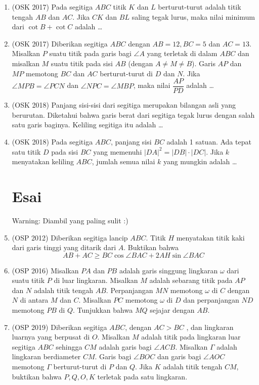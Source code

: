 \documentclass[12pt]{scrartcl}
\begin{document}
\begin{enumerate}
	
	\item
	(OSK 2017) Pada segitiga $ABC$ titik $K$ dan $L$ berturut-turut adalah titik tengah $AB$ dan $AC$. Jika $CK$ dan $BL$
saling tegak lurus, maka nilai minimum dari $\cot B + \cot C$ adalah \dots
	
	
	\item
	(OSK 2017) Diberikan segitiga $ABC$ dengan $AB = 12, BC = 5$ dan $AC = 13$. Misalkan $P$ suatu titik pada garis
bagi $\angle A$ yang terletak di dalam $ABC$ dan misalkan $M$ suatu titik pada sisi $AB$ (dengan $A\neq  M \neq
B$). Garis $AP$ dan $MP$ memotong $BC$ dan $AC$ berturut-turut di $D$ dan $N$. Jika $\angle MPB = \angle PCN$
dan $\angle NPC = \angle MBP$, maka nilai $\dfrac{AP}{PD}$
adalah \dots
	
	
	\item
	(OSK 2018)
	Panjang sisi-sisi dari segitiga merupakan bilangan asli yang berurutan. Diketahui bahwa garis berat dari
segitiga tegak lurus dengan salah satu garis baginya. Keliling segitiga itu adalah \dots
	
	
	\item
	(OSK 2018) Pada segitiga $ABC$, panjang sisi $BC$ adalah 1 satuan. Ada tepat satu titik $D$ pada sisi $BC$ yang memenuhi
$|DA|^2 = |DB| \cdot |DC|$. Jika $k$ menyatakan keliling $ABC$, jumlah semua nilai $k$ yang mungkin adalah \dots
	
	
	\section{Esai}
	Warning: Diambil yang paling sulit :)
	\item
	(OSP 2012) Diberikan segitiga lancip $ABC$. Titik $H$ menyatakan titik kaki dari garis tinggi yang ditarik dari $A$. Buktikan bahwa
	$$AB+AC \ge BC \cos \angle BAC + 2AH \sin \angle BAC$$
	
	\item
	(OSP 2016) Misalkan $PA$ dan $PB$ adalah garis singgung lingkaran $\omega$ dari suatu titik $P$ di luar lingkaran.
Misalkan $M$ adalah sebarang titik pada $AP$ dan $N$ adalah titik tengah $AB$. Perpanjangan
$MN$ memotong $\omega$ di $C$ dengan $N$ di antara $M$ dan $C$. Misalkan $PC$ memotong $\omega$ di $D$ dan
perpanjangan $ND$ memotong $PB$ di $Q$.
Tunjukkan bahwa $MQ$ sejajar dengan $AB$.
	
	\item (OSP 2019)
	Diberikan segitiga $ABC$, dengan $AC > BC$ , dan lingkaran luarnya yang berpusat di $O$. Misalkan $M$ adalah titik pada lingkaran luar segitiga $ABC$ sehingga $CM$ adalah garis bagi $\angle ACB$. Misalkan $\Gamma$ adalah lingkaran berdiameter $CM$. Garis bagi $\angle BOC$ dan garis bagi $\angle AOC$ memotong $\Gamma$ berturut-turut di $P$ dan $Q$. Jika $K$ adalah titik tengah $CM$, buktikan bahwa $P,Q,O,K$ terletak pada satu lingkaran.
\end{enumerate}
\end{document}
